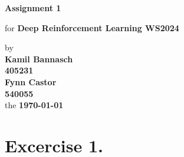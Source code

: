 \documentclass[12pt, a4paper,DIV=12, bibliography=totocnumbered]{scrartcl}
\newcommand{\ASSNR}{1}
\newcommand{\AuthorONE}{Kamil Bannasch}
\newcommand{\MatNoONE}{405231}
\newcommand{\AuthorTWO}{Fynn Castor}
\newcommand{\MatNoTWO}{540055}
\begin{document}
\begin{titlepage}
   \begin{center}
       \vspace*{5cm}

       \textbf{\Huge{Assignment \ASSNR}}

       \vspace{0.5cm}
        for {\large\textbf{Deep Reinforcement Learning WS2024}}
        \vspace{0.75cm}

       by \\
        \textbf{\AuthorONE}\\
        \vspace{0.125cm}
       	\textbf{\MatNoONE}\\ 
       	\vspace{0.25cm}
        \textbf{\AuthorTWO}\\
        \vspace{0.125cm}
       	\textbf{\MatNoTWO}\\ 
       	\vspace{0.25cm}
       the \textbf{\today}

       \vfill
    
    
            
   \end{center}
\end{titlepage}

\section{Excercise 1.}
\end{document}
